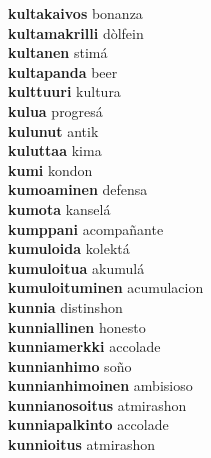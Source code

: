 \textbf{kultakaivos } bonanza \\
\textbf{kultamakrilli } dòlfein \\
\textbf{kultanen } stimá \\
\textbf{kultapanda } beer \\
\textbf{kulttuuri } kultura \\
\textbf{kulua } progresá \\
\textbf{kulunut } antik \\
\textbf{kuluttaa } kima \\
\textbf{kumi } kondon \\
\textbf{kumoaminen } defensa \\
\textbf{kumota } kanselá \\
\textbf{kumppani } acompañante \\
\textbf{kumuloida } kolektá \\
\textbf{kumuloitua } akumulá \\
\textbf{kumuloituminen } acumulacion \\
\textbf{kunnia } distinshon \\
\textbf{kunniallinen } honesto \\
\textbf{kunniamerkki } accolade \\
\textbf{kunnianhimo } soño \\
\textbf{kunnianhimoinen } ambisioso \\
\textbf{kunnianosoitus } atmirashon \\
\textbf{kunniapalkinto } accolade \\
\textbf{kunnioitus } atmirashon \\
